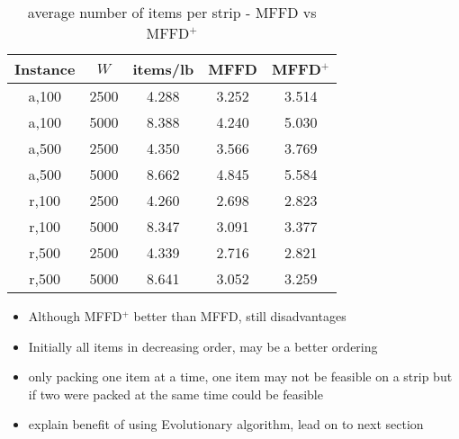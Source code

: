 \documentclass{elsarticle}
\begin{document}
\begin{table}[h!]
\centering
\caption{average number of items per strip - MFFD vs MFFD$^+$}
	\begin{tabular}{ccccc}\toprule
		Instance & $W$ & items/lb & MFFD & MFFD$^+$ \\ \midrule	
		a,100 & 2500 & 4.288 & 3.252 & 3.514 \\
		a,100 & 5000 & 8.388 & 4.240 & 5.030 \\
		\midrule
		a,500 & 2500 & 4.350 & 3.566 & 3.769 \\
		a,500 & 5000 & 8.662 & 4.845 & 5.584 \\
		\midrule
		\midrule
		r,100 & 2500 & 4.260 & 2.698 & 2.823 \\
		r,100 & 5000 & 8.347 & 3.091 & 3.377 \\
		\midrule
		r,500 & 2500 & 4.339 & 2.716 & 2.821 \\
		r,500 & 5000 & 8.641 & 3.052 & 3.259 \\
		\bottomrule
	\end{tabular}	
\end{table}


\begin{itemize}
	\item Although MFFD$^+$ better than MFFD, still disadvantages
	\item Initially all items in decreasing order, may be a better ordering
	\item only packing one item at a time, one item may not be feasible on a strip but if two were packed at the same time could be feasible
	\item explain benefit of using Evolutionary algorithm, lead on to next section
\end{itemize}
\end{document}
